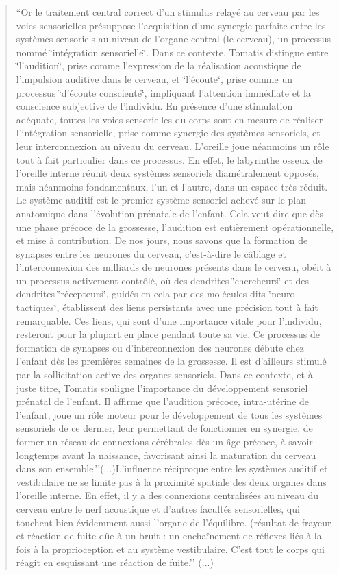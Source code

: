 \documentclass[12pt,french]{report}
\makeatletter
\let\SF@@footnote\footnote
\def\footnote{\ifx\protect\@typeset@protect
    \expandafter\SF@@footnote
  \else
    \expandafter\SF@gobble@opt
  \fi
}
\edef\SF@gobble@opt{\noexpand\protect
  \expandafter\noexpand\csname SF@gobble@opt \endcsname}
\makeatother
\begin{document}
\begin{quote}
\footnote{``Or le traitement central correct d'un stimulus relayé au cerveau
par les voies sensorielles présuppose l'acquisition d'une synergie
parfaite entre les systèmes sensoriels au niveau de l'organe central
(le cerveau), un processus nommé \char`\"{}intégration sensorielle\char`\"{}.
Dans ce contexte, Tomatis distingue entre \char`\"{}l'audition\char`\"{},
prise comme l'expression de la réalisation acoustique de l'impulsion
auditive dans le cerveau, et \char`\"{}l'écoute\char`\"{}, prise comme
un processus \char`\"{}d'écoute consciente\char`\"{}, impliquant l'attention
immédiate et la conscience subjective de l'individu. En présence d'une
stimulation adéquate, toutes les voies sensorielles du corps sont
en mesure de réaliser l'intégration sensorielle, prise comme synergie
des systèmes sensoriels, et leur interconnexion au niveau du cerveau.
L'oreille joue néanmoins un rôle tout à fait particulier dans ce processus.
En effet, le labyrinthe osseux de l'oreille interne réunit deux systèmes
sensoriels diamétralement opposés, mais néanmoins fondamentaux, l'un
et l'autre, dans un espace très réduit. Le système auditif est le
premier système sensoriel achevé sur le plan anatomique dans l'évolution
prénatale de l'enfant. Cela veut dire que dès une phase précoce de
la grossesse, l'audition est entièrement opérationnelle, et mise à
contribution. De nos jours, nous savons que la formation de synapses
entre les neurones du cerveau, c'est-à-dire le câblage et l'interconnexion
des milliards de neurones présents dans le cerveau, obéit à un processus
activement contrôlé, où des dendrites \char`\"{}chercheurs\char`\"{}
et des dendrites \char`\"{}récepteurs\char`\"{}, guidés en-cela par
des molécules dits \char`\"{}neuro-tactiques\char`\"{}, établissent
des liens persistants avec une précision tout à fait remarquable.
Ces liens, qui sont d'une importance vitale pour l'individu, resteront
pour la plupart en place pendant toute sa vie. Ce processus de formation
de synapses ou d'interconnexion des neurones débute chez l'enfant
dès les premières semaines de la grossesse. Il est d'ailleurs stimulé
par la sollicitation active des organes sensoriels. Dans ce contexte,
et à juste titre, Tomatis souligne l'importance du développement sensoriel
prénatal de l'enfant. Il affirme que l'audition précoce, intra-utérine
de l'enfant, joue un rôle moteur pour le développement de tous les
systèmes sensoriels de ce dernier, leur permettant de fonctionner
en synergie, de former un réseau de connexions cérébrales dès un âge
précoce, à savoir longtemps avant la naissance, favorisant ainsi la
maturation du cerveau dans son ensemble.''(...)L'influence réciproque
entre les systèmes auditif et vestibulaire ne se limite pas à la proximité
spatiale des deux organes dans l'oreille interne. En effet, il y a
des connexions centralisées au niveau du cerveau entre le nerf acoustique
et d'autres facultés sensorielles, qui touchent bien évidemment aussi
l'organe de l'équilibre. (résultat de frayeur et réaction de fuite
dûe à un bruit : un enchaînement de réflexes liés à la fois à la proprioception
et au système vestibulaire. C'est tout le corps qui réagit en esquissant
une réaction de fuite.'' (...)}
\end{quote}
\end{document}
